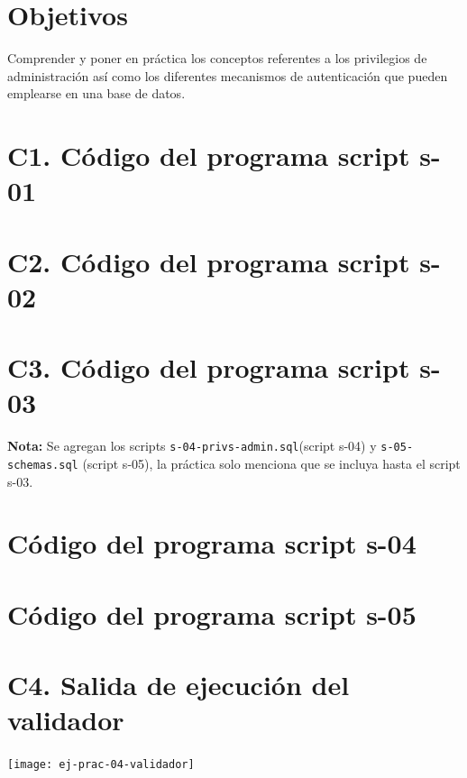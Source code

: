 \documentclass{article}
\begin{document}
\section*{Objetivos}
Comprender y poner en práctica los conceptos referentes a los privilegios de 
administración así como los diferentes mecanismos de autenticación
que pueden emplearse en una base de datos.

\section*{C1. Código del programa script s-01}



\newpage
\section*{C2. Código del programa script s-02}



\newpage
\section*{C3. Código del programa script s-03}



\textbf{Nota:} Se agregan los scripts \texttt{s-04-privs-admin.sql}(script s-04) 
y \texttt{s-05-schemas.sql} (script s-05), la práctica solo menciona que se 
incluya hasta el script s-03.\\

\section*{Código del programa script s-04}



\section*{Código del programa script s-05}



\section*{C4. Salida de ejecución del validador}
    \texttt{[image: ej-prac-04-validador]}    
\newpage
\end{document}
